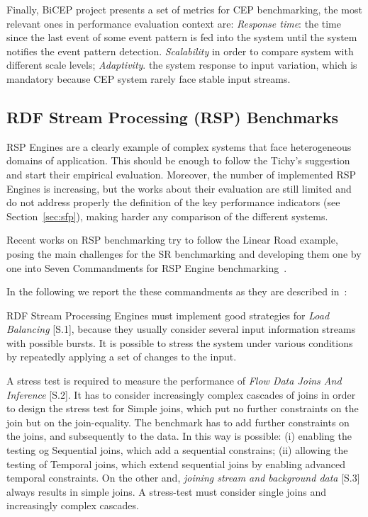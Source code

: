 Finally, BiCEP project presents a set of metrics for CEP benchmarking, the most relevant ones in performance evaluation context are: \textit{Response time}: the time since the last event of some event pattern is fed into the system until the system notifies the event pattern detection. \textit{Scalability} in order to compare system with different scale levels; \textit{Adaptivity}. the system response to input variation, which is mandatory because CEP system rarely face stable input streams.

\subsection{RDF Stream Processing (RSP) Benchmarks}\label{sec:sr-benchmarking}

RSP Engines are a clearly example of complex systems that face heterogeneous domains of application. This should be enough to follow the Tichy's suggestion and start their empirical evaluation. Moreover, the number of implemented RSP Engines is increasing, but the works about their evaluation are still limited and do not address properly the definition of the key performance indicators (see Section~\ref{sec:sfp}), making harder any comparison of the different systems.

Recent works on RSP benchmarking try to follow the Linear Road example, posing the main challenges for the SR benchmarking and developing them one by one into Seven Commandments for RSP Engine benchmarking~\cite{DBLP:conf/esws/ScharrenbachUMVB13}.

In the following we report the these commandments as they are described in~\cite{DBLP:conf/esws/ScharrenbachUMVB13}:
 
RDF Stream Processing Engines must implement good strategies for \textit{Load Balancing} [S.1], because they usually consider several input information streams with possible bursts. It is possible to stress the system under various conditions by repeatedly applying a set of changes to the input.

A stress test is required to measure the performance of \textit{Flow Data Joins And Inference} [S.2]. It has to consider increasingly complex cascades of joins in order to design the stress test for Simple joins, which put no further constraints on the join but on the join-equality. The benchmark has to add further constraints on the joins, and subsequently to the data. In this way is possible: (i) enabling the testing og Sequential joins, which add a sequential constrains;  (ii) allowing the testing of Temporal joins, which extend sequential joins by enabling advanced temporal constraints. On the other and, \textit{joining stream and background data} [S.3] always results in simple joins. A stress-test must consider single joins and increasingly complex cascades.

